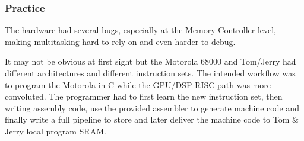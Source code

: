 \subsubsection{Practice}
The hardware had several bugs, especially at the Memory Controller level, making multitasking hard to rely on and even harder to debug.







It may not be obvious at first sight but the Motorola 68000 and Tom/Jerry had different architectures and different instruction sets. The intended workflow was to program the Motorola in C while the GPU/DSP RISC path was more convoluted. The programmer had to first learn the new instruction set, then writing assembly code, use the provided assembler to generate machine code and finally write a full pipeline to store and later deliver the machine code to Tom \& Jerry local program SRAM.\\
\par











